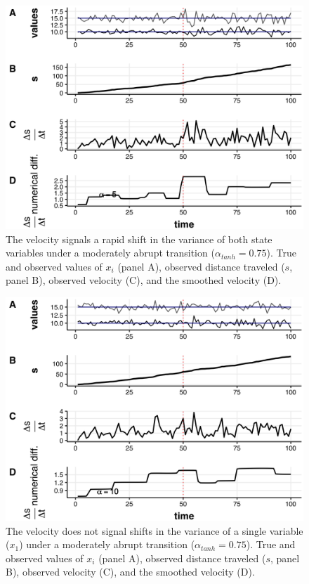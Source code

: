 \documentclass[print]{nuthesis}
\begin{document}
\newpage
\begin{figure}
\includegraphics[width=0.85\linewidth]{./chapterFiles/velocity/figsCalledInDiss/changeVarBoth_tanhAlpha075-5tvdiffAlpha-1000iter_stackTvdiff} \caption{The velocity signals a rapid shift in the variance of both state variables under a moderately abrupt transition ($\alpha_{tanh}=0.75$). True and observed values of $x_i$ (panel A), observed distance traveled ($s$, panel B), observed velocity (C), and the smoothed velocity (D). }\label{fig:varBoth}
\end{figure}
\newpage
\begin{figure}
\includegraphics[width=0.85\linewidth]{./chapterFiles/velocity/figsCalledInDiss/changeVarX1_tanhAlpha075-10tvdiffAlpha-1000iter_stackTvdiff} \caption{The velocity does not signal shifts in the variance of a single variable ($x_1$) under a moderately abrupt transition ($\alpha_{tanh}=0.75$). True and observed values of $x_i$ (panel A), observed distance traveled ($s$, panel B), observed velocity (C), and the smoothed velocity (D). }\label{fig:var1}
\end{figure}
\end{document}
